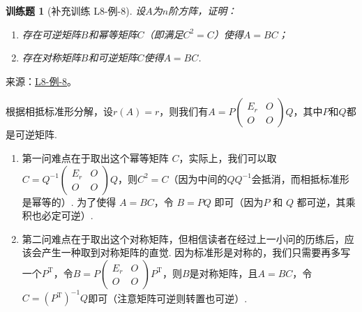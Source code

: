 \documentclass[UTF8,12pt,a4paper,fontset=fandol]{ctexart}
\newtheorem{exercise}{训练题}[section]
\begin{document}
\begin{exercise}[补充训练 L8-例-8]\label{prob:L8-例-8}
设$A$为$n$阶方阵，证明：
    \begin{enumerate}
        \item 存在可逆矩阵$B$和幂等矩阵$C$（即满足$C^2=C$）使得$A=BC$；
        \item 存在对称矩阵$B$和可逆矩阵$C$使得$A=BC$.
    \end{enumerate}
\end{exercise}
\noindent 来源：\href{https://github.com/yhwu-is/Linear-Algebra-Left-Undone/blob/new/%E8%AE%B2%E4%B9%89/%E4%B8%93%E9%A2%98/8%20%E7%9B%B8%E6%8A%B5%E6%A0%87%E5%87%86%E5%BD%A2.tex}{L8-例-8}。
\begin{solve}
根据相抵标准形分解，设$r(A)=r$，则我们有$A=P\begin{pmatrix}
            E_r & O \\ O & O
        \end{pmatrix}Q$，其中$P$和$Q$都是可逆矩阵.
    \begin{enumerate}
        \item 第一问难点在于取出这个幂等矩阵 $C$，实际上，我们可以取$C=Q^{-1}\begin{pmatrix}
                      E_r & O \\ O & O
                  \end{pmatrix}Q$，则$C^2=C$（因为中间的$QQ^{-1}$会抵消，而相抵标准形是幂等的）. 为了使得 $A = BC$，令 $B = PQ$ 即可（因为$P$ 和 $Q$ 都可逆，其乘积也必定可逆）.

        \item 第二问难点在于取出这个对称矩阵，但相信读者在经过上一小问的历练后，应该会产生一种取到对称矩阵的直觉. 因为标准形是对称的，我们只需要再多写一个$P^\mathrm{T}$，令$B=P\begin{pmatrix}
                      E_r & O \\ O & O
                  \end{pmatrix}P^\mathrm{T}$，则$B$是对称矩阵，且$A=BC$，令$C=(P^\mathrm{T})^{-1}Q$即可（注意矩阵可逆则转置也可逆）.
    \end{enumerate}
\end{solve}
\end{document}
